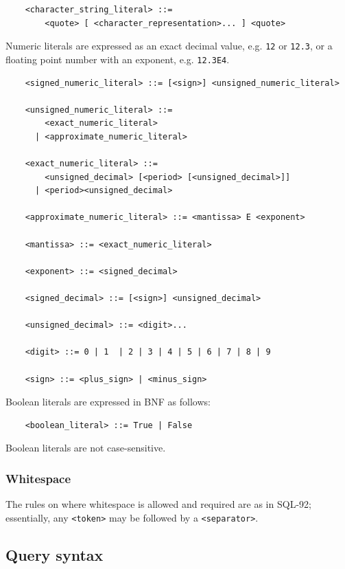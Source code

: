 \documentclass[11pt,a4paper]{ivoa}
\begin{document}
\begin{verbatim}
    <character_string_literal> ::=
        <quote> [ <character_representation>... ] <quote>
\end{verbatim}

Numeric literals are expressed as an exact decimal value, e.g. \verb:12: or
\verb:12.3:, or a floating point number with an exponent, e.g. \verb:12.3E4:.

\begin{verbatim}
    <signed_numeric_literal> ::= [<sign>] <unsigned_numeric_literal>

    <unsigned_numeric_literal> ::= 
        <exact_numeric_literal>
      | <approximate_numeric_literal>
              
    <exact_numeric_literal> ::=
        <unsigned_decimal> [<period> [<unsigned_decimal>]]
      | <period><unsigned_decimal>

    <approximate_numeric_literal> ::= <mantissa> E <exponent>

    <mantissa> ::= <exact_numeric_literal>

    <exponent> ::= <signed_decimal>

    <signed_decimal> ::= [<sign>] <unsigned_decimal>

    <unsigned_decimal> ::= <digit>...

    <digit> ::= 0 | 1  | 2 | 3 | 4 | 5 | 6 | 7 | 8 | 9
    
    <sign> ::= <plus_sign> | <minus_sign>
\end{verbatim}

Boolean literals are expressed in BNF as follows:

\begin{verbatim}
    <boolean_literal> ::= True | False
\end{verbatim}

Boolean literals are not case-sensitive.

\subsubsection{Whitespace}
\label{sec:whitespace}

The rules on where whitespace is allowed and required are as in SQL-92;
essentially, any \verb:<token>: may be followed by a \verb:<separator>:.

\clearpage
\subsection{Query syntax}
\label{sec:syntax}
\end{document}
